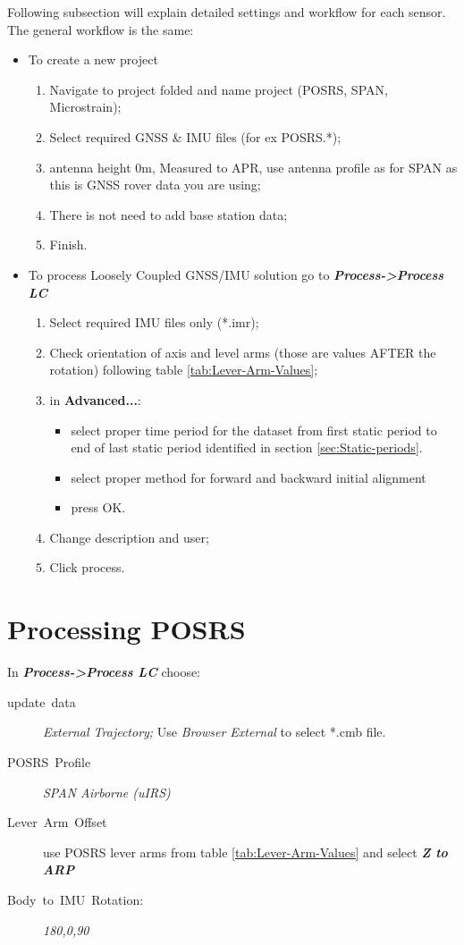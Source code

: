 \documentclass[11pt,fleqn]{book} %
\begin{document}
Following subsection will explain detailed settings and workflow for each sensor. The general workflow is the same:
\medskip
\begin{itemize}
	\item To create a new project 
	\begin{enumerate}
		\item Navigate to project folded and name project (POSRS, SPAN, Microstrain);
		\item Select required GNSS \& IMU files (for ex POSRS.{*});
		\item antenna height 0m, Measured to APR, use antenna profile as for SPAN as this is GNSS rover data you are using;
		\item There is not need to add base station data;
		\item Finish.
	\end{enumerate}
	\item To process Loosely Coupled GNSS/IMU solution go to \textbf{\emph{Process->Process LC}}
		\begin{enumerate}
			\item Select required IMU files only ({*}.imr);
			\item Check orientation of axis and level arms (those are values AFTER the rotation) following table \ref{tab:Lever-Arm-Values};
			\item in \textbf{Advanced...}:
			\begin{itemize}
			 	\item select proper time period for the dataset from first static period to end of last static period identified in section \ref{sec:Static-periods}.
			 	\item select proper method for forward and backward initial alignment
			 	\item press OK.
			 \end{itemize} 
			\item Change description and user;
			\item Click process.
		\end{enumerate}
\end{itemize}



\section{Processing POSRS\label{sub:Processing-POSRS}}

In \textbf{\emph{Process->Process LC}} choose:
\begin{description}
	\item [{update~data}] \emph{External Trajectory; }Use \emph{Browser External} to select {*}.cmb file.
	\item [{POSRS~Profile}] \emph{SPAN Airborne (uIRS)}
	\item [{Lever~Arm~Offset}] use POSRS lever arms from table \ref{tab:Lever-Arm-Values} and select \textbf{\emph{Z to ARP}}
	\item [{Body~to~IMU~Rotation:}] \emph{180,0,90 }
	\end{description}
	
\end{document}
